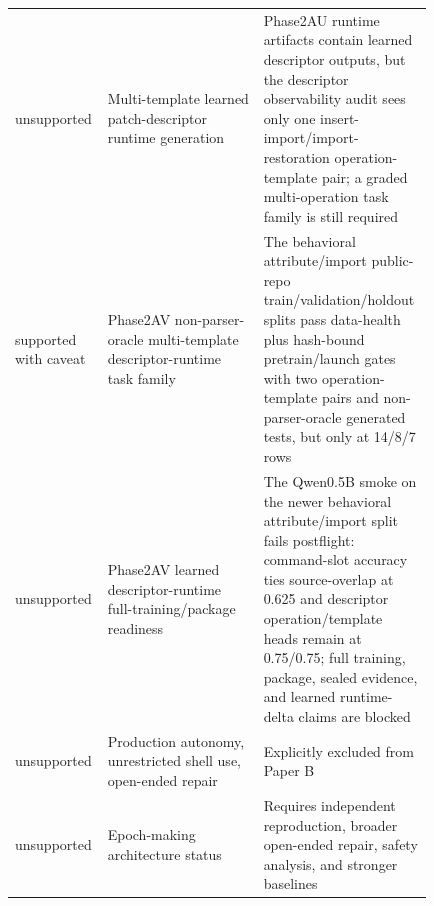 \begin{table}[ht]
\begin{tabular}{@{}>{\raggedright\arraybackslash}p{0.13\linewidth}>{\raggedright\arraybackslash}p{0.36\linewidth}>{\raggedright\arraybackslash}p{0.34\linewidth}@{}}
unsupported & Multi-template learned patch-descriptor runtime generation & Phase2AU runtime artifacts contain learned descriptor outputs, but the descriptor observability audit sees only one insert-import/import-restoration operation-template pair; a graded multi-operation task family is still required \\
supported with caveat & Phase2AV non-parser-oracle multi-template descriptor-runtime task family & The behavioral attribute/import public-repo train/validation/holdout splits pass data-health plus hash-bound pretrain/launch gates with two operation-template pairs and non-parser-oracle generated tests, but only at 14/8/7 rows \\
unsupported & Phase2AV learned descriptor-runtime full-training/package readiness & The Qwen0.5B smoke on the newer behavioral attribute/import split fails postflight: command-slot accuracy ties source-overlap at 0.625 and descriptor operation/template heads remain at 0.75/0.75; full training, package, sealed evidence, and learned runtime-delta claims are blocked \\
unsupported & Production autonomy, unrestricted shell use, open-ended repair & Explicitly excluded from Paper B \\
unsupported & Epoch-making architecture status & Requires independent reproduction, broader open-ended repair, safety analysis, and stronger baselines \\
\bottomrule
\end{tabular}
\end{table}
